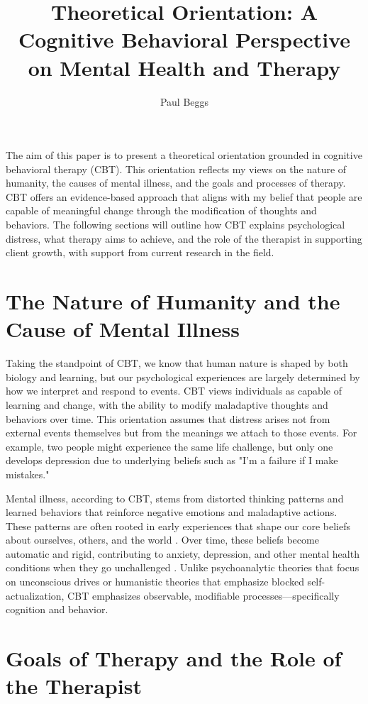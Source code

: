 \documentclass[stu]{apa7}
\title{Theoretical Orientation: A Cognitive Behavioral Perspective on Mental Health and Therapy}
\author{Paul Beggs}
\begin{document}
\maketitle


The aim of this paper is to present a theoretical orientation grounded in cognitive behavioral therapy (CBT). This orientation reflects my views on the nature of humanity, the causes of mental illness, and the goals and processes of therapy. CBT offers an evidence-based approach that aligns with my belief that people are capable of meaningful change through the modification of thoughts and behaviors. The following sections will outline how CBT explains psychological distress, what therapy aims to achieve, and the role of the therapist in supporting client growth, with support from current research in the field.

\section{The Nature of Humanity and the Cause of Mental Illness}

Taking the standpoint of CBT, we know that human nature is shaped by both biology and learning, but our psychological experiences are largely determined by how we interpret and respond to events. CBT views individuals as capable of learning and change, with the ability to modify maladaptive thoughts and behaviors over time. This orientation assumes that distress arises not from external events themselves but from the meanings we attach to those events. For example, two people might experience the same life challenge, but only one develops depression due to underlying beliefs such as "I'm a failure if I make mistakes."

Mental illness, according to CBT, stems from distorted thinking patterns and learned behaviors that reinforce negative emotions and maladaptive actions. These patterns are often rooted in early experiences that shape our core beliefs about ourselves, others, and the world \parencite{clark2011cognitive}. Over time, these beliefs become automatic and rigid, contributing to anxiety, depression, and other mental health conditions when they go unchallenged \parencite{clark2011cognitive}. Unlike psychoanalytic theories that focus on unconscious drives or humanistic theories that emphasize blocked self-actualization, CBT emphasizes observable, modifiable processes—specifically cognition and behavior.

\section{Goals of Therapy and the Role of the Therapist}
\end{document}
